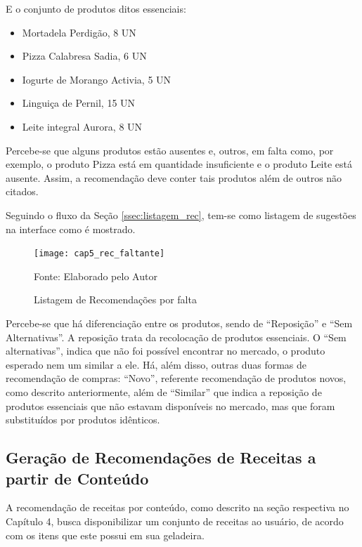 E o conjunto de produtos ditos essenciais:

\begin{itemize} \parskip -3pt
    \item Mortadela Perdigão, 8 UN
    \item Pizza Calabresa Sadia, 6 UN
    \item Iogurte de Morango Activia, 5 UN
    \item Linguiça de Pernil, 15 UN
    \item Leite integral Aurora, 8 UN
\end{itemize}


Percebe-se que alguns produtos estão ausentes e, outros, em falta como, por exemplo, o produto Pizza está em quantidade insuficiente e o produto Leite está ausente. Assim, a recomendação deve conter tais produtos além de outros não citados.

Seguindo o fluxo da Seção \ref{ssec:listagem_rec}, tem-se como listagem de sugestões na interface como é mostrado.

\begin{figure}[htb]
    \caption{Listagem de Recomendações por falta}
    \label{fig:cap5_rec_faltante}
    \texttt{[image: cap5\_rec\_faltante]}
    
    \footnotesize{Fonte: Elaborado pelo Autor}
\end{figure}


Percebe-se que há diferenciação entre os produtos, sendo de ``Reposição'' e ``Sem Alternativas''. A reposição trata da recolocação de produtos essenciais. O ``Sem alternativas'', indica que não foi possível encontrar no mercado, o produto esperado nem um similar a ele. Há, além disso, outras duas formas de recomendação de compras: ``Novo'', referente recomendação de produtos novos, como descrito anteriormente, além de ``Similar'' que indica a reposição de produtos essenciais que não estavam disponíveis no mercado, mas que foram substituídos por produtos idênticos.

\subsection{Geração de Recomendações de Receitas a partir de Conteúdo}

A recomendação de receitas por conteúdo, como descrito na seção respectiva no Capítulo 4, busca disponibilizar um conjunto de receitas ao usuário, de acordo com os itens que este possui em sua geladeira. 

